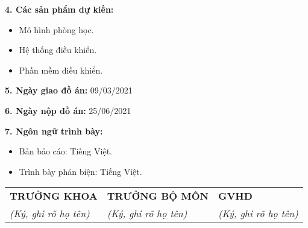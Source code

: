 \textbf{4. Các sản phẩm dự kiến: }
\begin{itemize}
\item Mô hình phòng học.
\item Hệ thống điều khiển.
\item Phần mềm điều khiển.
\end{itemize}

\textbf{5. Ngày giao đồ án: } 09/03/2021

\textbf{6. Ngày nộp đồ án: } 25/06/2021

\textbf{7. Ngôn ngữ trình bày: }
\begin{itemize}
\item Bản bảo cáo: Tiếng Việt.
\item Trình bày phản biện: Tiếng Việt.
\end{itemize}

\begin{center}
\begin{tabular}{w{c}{0.3\linewidth} w{c}{0.3\linewidth} w{c}{0.3\linewidth}}

\textbf{TRƯỞNG KHOA} & \textbf{TRƯỞNG BỘ MÔN} & \textbf{GVHD} \\ 

\textit{(Ký, ghi rõ họ tên)} & \textit{(Ký, ghi rõ họ tên)} & \textit{(Ký, ghi rõ họ tên)} \\ 

\end{tabular} 
\end{center}